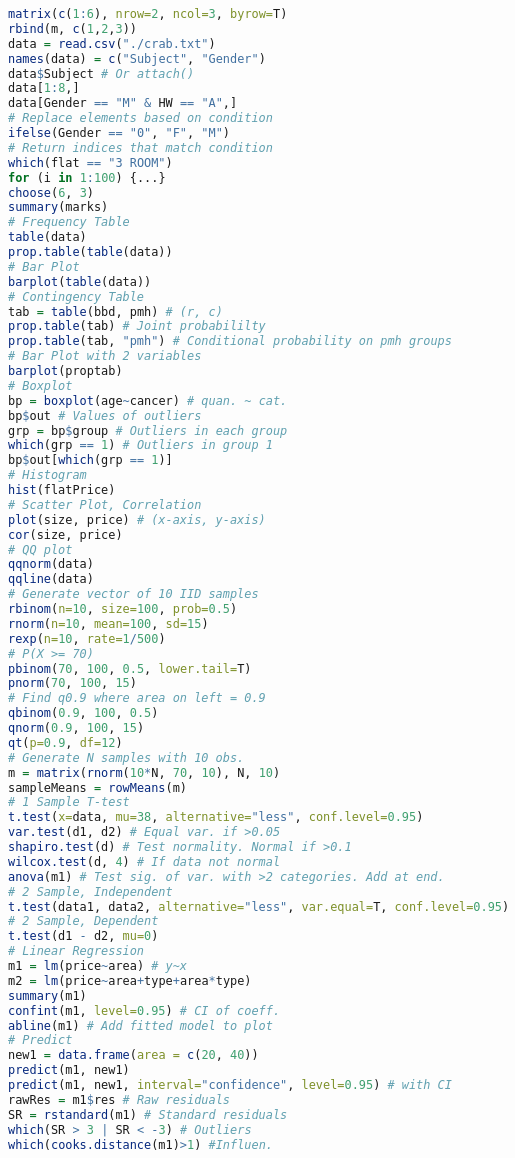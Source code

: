 \documentclass{article}
\begin{document}
\begin{multicols*}{4}
\begin{lstlisting}[language=R, breaklines=true]
matrix(c(1:6), nrow=2, ncol=3, byrow=T)
rbind(m, c(1,2,3))
data = read.csv("./crab.txt")
names(data) = c("Subject", "Gender")
data$Subject # Or attach()
data[1:8,]
data[Gender == "M" & HW == "A",]
# Replace elements based on condition
ifelse(Gender == "0", "F", "M")
# Return indices that match condition
which(flat == "3 ROOM")
for (i in 1:100) {...}
choose(6, 3)
summary(marks)
# Frequency Table
table(data)
prop.table(table(data))
# Bar Plot
barplot(table(data))
# Contingency Table 
tab = table(bbd, pmh) # (r, c)
prop.table(tab) # Joint probabililty
prop.table(tab, "pmh") # Conditional probability on pmh groups
# Bar Plot with 2 variables
barplot(proptab)
# Boxplot
bp = boxplot(age~cancer) # quan. ~ cat.
bp$out # Values of outliers
grp = bp$group # Outliers in each group
which(grp == 1) # Outliers in group 1
bp$out[which(grp == 1)] 
# Histogram
hist(flatPrice)
# Scatter Plot, Correlation
plot(size, price) # (x-axis, y-axis)
cor(size, price)
# QQ plot
qqnorm(data)
qqline(data)
# Generate vector of 10 IID samples 
rbinom(n=10, size=100, prob=0.5)
rnorm(n=10, mean=100, sd=15)
rexp(n=10, rate=1/500)
# P(X >= 70)
pbinom(70, 100, 0.5, lower.tail=T)
pnorm(70, 100, 15)
# Find q0.9 where area on left = 0.9
qbinom(0.9, 100, 0.5)
qnorm(0.9, 100, 15)
qt(p=0.9, df=12)
# Generate N samples with 10 obs.
m = matrix(rnorm(10*N, 70, 10), N, 10)
sampleMeans = rowMeans(m)
# 1 Sample T-test
t.test(x=data, mu=38, alternative="less", conf.level=0.95)
var.test(d1, d2) # Equal var. if >0.05
shapiro.test(d) # Test normality. Normal if >0.1
wilcox.test(d, 4) # If data not normal
anova(m1) # Test sig. of var. with >2 categories. Add at end.
# 2 Sample, Independent
t.test(data1, data2, alternative="less", var.equal=T, conf.level=0.95)
# 2 Sample, Dependent
t.test(d1 - d2, mu=0)
# Linear Regression
m1 = lm(price~area) # y~x
m2 = lm(price~area+type+area*type) 
summary(m1)
confint(m1, level=0.95) # CI of coeff.
abline(m1) # Add fitted model to plot
# Predict
new1 = data.frame(area = c(20, 40))
predict(m1, new1)
predict(m1, new1, interval="confidence", level=0.95) # with CI
rawRes = m1$res # Raw residuals
SR = rstandard(m1) # Standard residuals
which(SR > 3 | SR < -3) # Outliers
which(cooks.distance(m1)>1) #Influen.
\end{lstlisting}

\end{multicols*}
\end{document}
